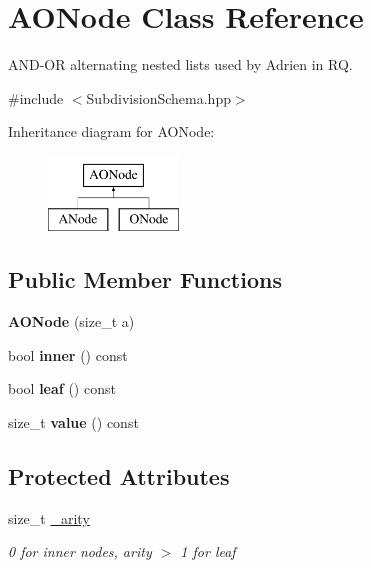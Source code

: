 \hypertarget{classAONode}{}\section{A\+O\+Node Class Reference}
\label{classAONode}


A\+N\+D-\/\+OR alternating nested lists used by Adrien in RQ.  




{\ttfamily \#include $<$Subdivision\+Schema.\+hpp$>$}

Inheritance diagram for A\+O\+Node\+:\begin{figure}[H]
\begin{center}
\leavevmode
\includegraphics[height=2.000000cm]{classAONode}
\end{center}
\end{figure}
\subsection*{Public Member Functions}
\begin{DoxyCompactItemize}
\item 
\mbox{\label{classAONode_a8b2b854573f53b3105ff193d7128bf5a}} 
{\bfseries A\+O\+Node} (size\+\_\+t a)
\item 
\mbox{\label{classAONode_a79196ae7696619f60eadcd96eb4750f1}} 
bool {\bfseries inner} () const
\item 
\mbox{\label{classAONode_a63996089a9dc6c2320fb91b54c0fdcc6}} 
bool {\bfseries leaf} () const
\item 
\mbox{\label{classAONode_ac1ac6a913dc66d8e344dfde2266f8c5c}} 
size\+\_\+t {\bfseries value} () const
\end{DoxyCompactItemize}
\subsection*{Protected Attributes}
\begin{DoxyCompactItemize}
\item 
\mbox{\label{classAONode_a68dc0af71d8e6bac30b8ff9ec40ff806}} 
size\+\_\+t \mbox{\hyperlink{classAONode_a68dc0af71d8e6bac30b8ff9ec40ff806}{\+\_\+arity}}
\begin{DoxyCompactList}\small\item\em 0 for inner nodes, arity $>$ 1 for leaf \end{DoxyCompactList}\end{DoxyCompactItemize}


